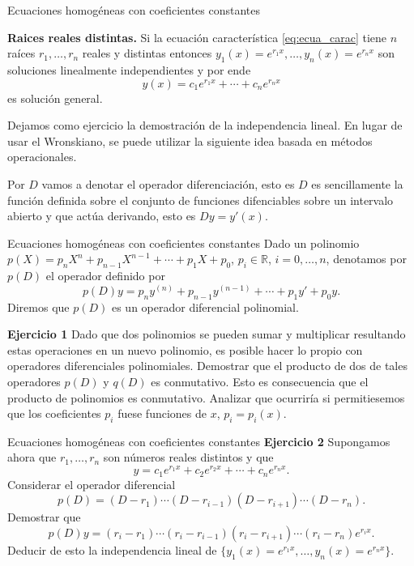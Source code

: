 \documentclass[handout,hyperref={colorlinks=true}]{beamer}
\newcommand{\rr}{\mathbb{R}}
\renewcommand{\emph}[1]{\textcolor[rgb]{1,0,0}{#1}}
\begin{document}
\begin{frame}{Ecuaciones homogéneas con coeficientes constantes}

\textbf{Raices reales distintas.}
Si la ecuación característica \eqref{eq:ecua_carac} tiene $n$ raíces $r_1,\ldots,r_n$ reales y distintas entonces 
$y_1(x)=e^{r_1x},\ldots,y_n(x)=e^{r_nx}$ son soluciones linealmente independientes y por ende
\[\boxed{y(x)=c_1e^{r_1x}+\cdots+c_ne^{r_nx}}\]
es solución general. 

Dejamos como ejercicio la demostración de la independencia lineal. En lugar de usar el Wronskiano, se puede utilizar  la siguiente idea basada en métodos operacionales. 

Por $D$ vamos a denotar el operador diferenciación, esto es $D$ es sencillamente la función  definida sobre el conjunto de funciones difenciables sobre un intervalo abierto y que actúa derivando, esto es $Dy=y'(x)$. 





\end{frame}





\begin{frame}{Ecuaciones homogéneas con coeficientes constantes}
Dado un polinomio $p(X)=p_nX^n+p_{n-1}X^{n-1}+\cdots+p_1X+p_0$, $p_i\in\rr$, $i=0,\ldots,n$, denotamos por  $p(D)$ el operador definido por
\[p(D)y=p_ny^{(n)}+p_{n-1}y^{(n-1)}+\cdots+p_1y'+p_0y.\]
Diremos que $p(D)$ es un \emph{operador diferencial polinomial}. 

\textbf{Ejercicio 1} Dado que dos polinomios se pueden sumar y multiplicar resultando estas operaciones en un nuevo polinomio, es posible hacer lo propio con operadores diferenciales polinomiales. Demostrar que el producto de dos de tales operadores  $p(D)$ y $q(D)$ es conmutativo. Esto es consecuencia que el producto de polinomios es conmutativo. Analizar que ocurriría si permitiesemos que los coeficientes $p_i$ fuese funciones de $x$, $p_i=p_i(x)$.
 
\end{frame}

\begin{frame}{Ecuaciones homogéneas con coeficientes constantes}
\textbf{Ejercicio 2} Supongamos ahora que $r_1,\ldots,r_n$ son números reales distintos y que 
\[y=c_1e^{r_1x}+c_2e^{r_2x}+\cdots+c_ne^{r_nx}.\]
Considerar el operador diferencial
\[p(D)=(D-r_1)\cdots(D-r_{i-1})(D-r_{i+1})\cdots(D-r_n).\]
Demostrar que
\[p(D)y=(r_i-r_1)\cdots(r_i-r_{i-1})(r_i-r_{i+1})\cdots(r_i-r_n)e^{r_ix}.\]
Deducir de esto la independencia lineal de $\{y_1(x)=e^{r_1x},\ldots,y_n(x)=e^{r_nx}\}$.
\end{frame}
\end{document}
